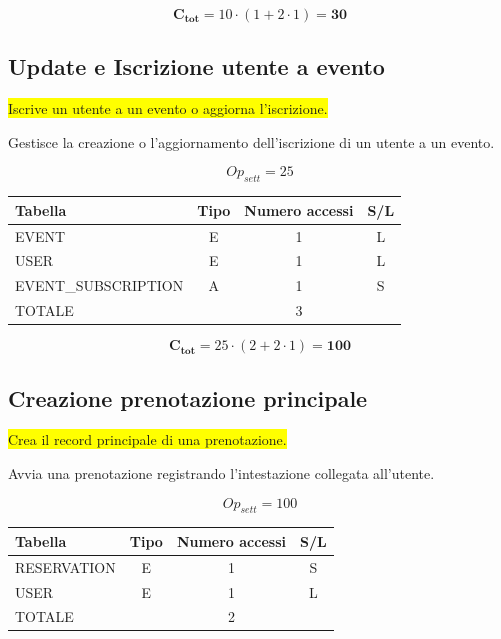 \documentclass[a4paper,12pt]{report}
\begin{document}
$$\mathbf{C_{tot}} = 10 \cdot (1 + 2 \cdot 1) = \mathbf{30}$$

\subsection*{Update e Iscrizione utente a evento} \label{op12}
\colorbox{yellow}{Iscrive un utente a un evento o aggiorna l'iscrizione.}

Gestisce la creazione o l'aggiornamento dell'iscrizione di un utente
a un evento.

$$Op_{sett} = 25$$

\begin{table}[H]
  \centering
  \small
  \renewcommand{\arraystretch}{1.15}
  \begin{tabularx}{0.8\textwidth}{|X|c|c|c|}
    \hline
    \rowcolor{gray!20}
    \textbf{Tabella} & \textbf{Tipo} & \textbf{Numero accessi} & \textbf{S/L} \\
    \hline
    EVENT & E & 1 & L \\
    USER & E & 1 & L \\
    EVENT\_SUBSCRIPTION & A & 1 & S \\
    \hline
    \rowcolor{gray!20}
    TOTALE & & 3 & \\
    \hline
  \end{tabularx}
  \vspace{-1em}
\end{table}

$$\mathbf{C_{tot}} = 25 \cdot (2 + 2 \cdot 1) = \mathbf{100}$$

\subsection*{Creazione prenotazione principale} \label{op13}
\colorbox{yellow}{Crea il record principale di una prenotazione.}

Avvia una prenotazione registrando l'intestazione collegata all'utente.

$$Op_{sett} = 100$$

\begin{table}[H]
  \centering
  \small
  \renewcommand{\arraystretch}{1.15}
  \begin{tabularx}{0.8\textwidth}{|X|c|c|c|}
    \hline
    \rowcolor{gray!20}
    \textbf{Tabella} & \textbf{Tipo} & \textbf{Numero accessi} & \textbf{S/L} \\
    \hline
    RESERVATION & E & 1 & S \\
    USER & E & 1 & L \\
    \hline
    \rowcolor{gray!20}
    TOTALE & & 2 & \\
    \hline
  \end{tabularx}
  \vspace{-1em}
\end{table}
\end{document}
